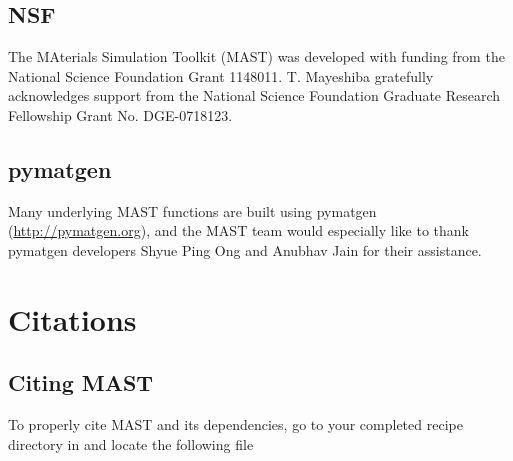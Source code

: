\documentclass[letterpaper,10pt,english]{sphinxmanual}
\begin{document}
\section{NSF}
\label{10_0_acknowledgments:nsf}

The MAterials Simulation Toolkit (MAST) was developed with funding from the National Science Foundation Grant 1148011. T. Mayeshiba gratefully acknowledges support from the National Science Foundation Graduate Research Fellowship Grant No. DGE-0718123.


\section{pymatgen}
\label{10_0_acknowledgments:pymatgen}

Many underlying MAST functions are built using pymatgen (\href{http://pymatgen.org}{http://pymatgen.org}), and the MAST team would especially like to thank pymatgen developers Shyue Ping Ong and Anubhav Jain for their assistance.


\chapter{Citations}
\label{15_0_citations:citations}\label{15_0_citations::doc}

\section{Citing MAST}
\label{15_0_citations:citing-mast}
To properly cite MAST and its dependencies, go to your completed recipe directory in  and locate the following file
\end{document}
